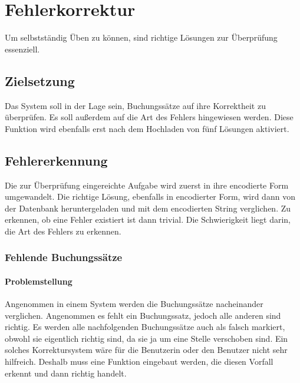 \documentclass[12pt]{report}
\begin{document}
\chapter{Fehlerkorrektur}
 
Um selbstständig Üben zu können, sind richtige Lösungen zur Überprüfung essenziell.

\section{Zielsetzung}
Das System soll in der Lage sein, Buchungssätze auf ihre Korrektheit zu überprüfen. Es soll außerdem auf die Art des Fehlers hingewiesen werden. Diese Funktion wird ebenfalls erst nach dem Hochladen von fünf Lösungen aktiviert.

\section{Fehlererkennung}
Die zur Überprüfung eingereichte Aufgabe wird zuerst in ihre encodierte Form umgewandelt. Die richtige Lösung, ebenfalls in encodierter Form, wird dann von der Datenbank heruntergeladen und mit dem encodierten String verglichen. Zu erkennen, ob eine Fehler existiert ist dann trivial. Die Schwierigkeit liegt darin, die Art des Fehlers zu erkennen.

\subsection{Fehlende Buchungssätze}

\subsubsection{Problemstellung}
Angenommen in einem System werden die Buchungssätze nacheinander verglichen. Angenommen es fehlt ein Buchungssatz, jedoch alle anderen sind richtig. Es werden alle nachfolgenden Buchungssätze auch als falsch markiert, obwohl sie eigentlich richtig sind, da sie ja um eine Stelle verschoben sind. Ein solches Korrektursystem wäre für die Benutzerin oder den Benutzer nicht sehr hilfreich. Deshalb muss eine Funktion eingebaut werden, die diesen Vorfall erkennt und dann richtig handelt. 
\end{document}
